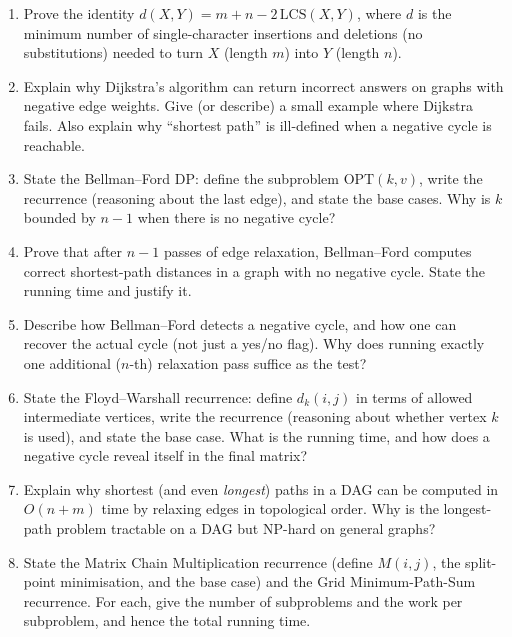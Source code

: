 \documentclass[11pt]{article}
\begin{document}
\begin{enumerate}[label=\textbf{A\arabic*.}, leftmargin=2.2em]
\item Prove the identity $d(X,Y) = m + n - 2\,\mathrm{LCS}(X,Y)$, where $d$ is the minimum
number of single-character insertions and deletions (no substitutions) needed to turn $X$
(length $m$) into $Y$ (length $n$).

\item Explain why Dijkstra's algorithm can return incorrect answers on graphs with negative
edge weights. Give (or describe) a small example where Dijkstra fails. Also explain why
``shortest path'' is ill-defined when a negative cycle is reachable.

\item State the Bellman--Ford DP: define the subproblem $\mathrm{OPT}(k,v)$, write the
recurrence (reasoning about the last edge), and state the base cases. Why is $k$ bounded by
$n-1$ when there is no negative cycle?

\item Prove that after $n-1$ passes of edge relaxation, Bellman--Ford computes correct
shortest-path distances in a graph with no negative cycle. State the running time and
justify it.

\item Describe how Bellman--Ford detects a negative cycle, and how one can recover the actual
cycle (not just a yes/no flag). Why does running exactly one additional ($n$-th) relaxation
pass suffice as the test?

\item State the Floyd--Warshall recurrence: define $d_k(i,j)$ in terms of allowed
intermediate vertices, write the recurrence (reasoning about whether vertex $k$ is used),
and state the base case. What is the running time, and how does a negative cycle reveal
itself in the final matrix?

\item Explain why shortest (and even \emph{longest}) paths in a DAG can be computed in
$O(n+m)$ time by relaxing edges in topological order. Why is the longest-path problem
tractable on a DAG but NP-hard on general graphs?

\item State the Matrix Chain Multiplication recurrence (define $M(i,j)$, the split-point
minimisation, and the base case) and the Grid Minimum-Path-Sum recurrence. For each, give
the number of subproblems and the work per subproblem, and hence the total running time.

\end{enumerate}
\end{document}
